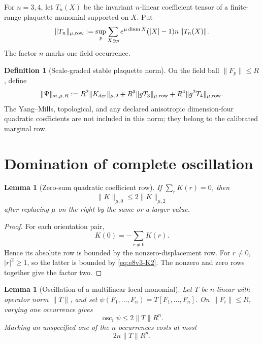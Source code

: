 \documentclass[11pt,oneside]{book}
\newtheorem{lemma}[theorem]{Lemma}
\theoremstyle{definition}
\newtheorem{definition}[theorem]{Definition}
\theoremstyle{remark}
\newcommand{\osc}{\operatorname{osc}}
\begin{document}
For \(n=3,4\), let \(T_n(X)\) be the invariant \(n\)-linear
coefficient tensor of a finite-range plaquette monomial supported on
\(X\).  Put
\[
 \|T_n\|_{\mu,\rm row}
 :=
 \sup_p\sum_{X\ni p}
 e^{\mu\operatorname{diam}X}
 (|X|-1)n\,\|T_n(X)\|.                               \label{eq:e8v3-Trow}
\]
The factor \(n\) marks one field occurrence.

\begin{definition}[Scale-graded stable plaquette norm]
\label{def:e8v3-stable}
On the field ball \(\|F_p\|\leq R\), define
\[
 \|\Psi\|_{{\rm st},\mu,R}
 :=
 R^2\|K_{\rm der}\|_{\mu,2}
 +R^3\|gT_3\|_{\mu,\rm row}
 +R^4\|g^2T_4\|_{\mu,\rm row}.                       \label{eq:e8v3-stable}
\]
The Yang--Mills, topological, and any declared anisotropic
dimension-four quadratic coefficients are not included in this norm;
they belong to the calibrated marginal row.
\end{definition}

\section{Domination of complete oscillation}
\label{sec:e8v3-oscillation}

\begin{lemma}[Zero-sum quadratic coefficient row]
\label{lem:e8v3-zero-sum}
If \(\sum_rK(r)=0\), then
\[
 \|K\|_{\mu,0}
 \leq
 2\|K\|_{\mu,2}                                      \label{eq:e8v3-zero-sum}
\]
after replacing \(\mu\) on the right by the same or a larger value.
\end{lemma}

\begin{proof}
For each orientation pair,
\[
 K(0)=-\sum_{r\neq0}K(r).
\]
Hence its absolute row is bounded by the nonzero-displacement row.
For \(r\neq0\), \(|r|^2\geq1\), so the latter is bounded by
\eqref{eq:e8v3-K2}.  The nonzero and zero rows together give the
factor two.
\end{proof}

\begin{lemma}[Oscillation of a multilinear local monomial]
\label{lem:e8v3-monomial}
Let \(T\) be \(n\)-linear with operator norm \(\|T\|\), and set
\(\psi(F_1,\ldots,F_n)=T[F_1,\ldots,F_n]\).
On \(\|F_i\|\leq R\), varying one occurrence gives
\[
 \osc_i\psi\leq2\|T\|R^n.                            \label{eq:e8v3-monomial-osc}
\]
Marking an unspecified one of the \(n\) occurrences costs at most
\[
 2n\|T\|R^n.                                         \label{eq:e8v3-monomial-mark}
\]
\end{lemma}
\end{document}
